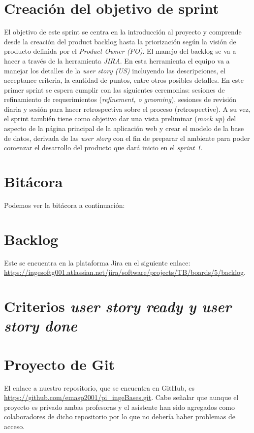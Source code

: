 \documentclass{article}
\begin{document}
\section{Creación del objetivo de sprint}
El objetivo de este sprint se centra en la introducción al proyecto y
comprende desde la creación del product backlog hasta la priorización
según la visión de producto definida por el \textit{Product Owner (PO)}.
El manejo del backlog se va a hacer a través de la herramienta \textit{JIRA}.
En esta herramienta el equipo va a manejar los detalles de la
\textit{user story (US)} incluyendo las descripciones, el acceptance
criteria, la cantidad de puntos, entre otros posibles detalles. En este
primer sprint se espera cumplir con las siguientes ceremonias: sesiones
de refinamiento de requerimientos (\textit{refinement, o grooming}),
sesiones de revisión diaria y sesión para hacer retrospectiva sobre el
proceso (retrospective). A su vez, el sprint también tiene como objetivo
dar una vista preliminar (\textit{mock up}) del aspecto de la página principal de
la aplicación web y crear el modelo de la base de datos, derivada de las
\textit{user story} con el fin de preparar el ambiente para poder comenzar
el desarrollo del producto que dará inicio en el \textit{sprint 1}. 

\section{Bitácora}
Podemos ver la bitácora a continuación:

\section{Backlog}
Este se encuentra en la plataforma Jira en el siguiente enlace:
\url{https://ingesoftg001.atlassian.net/jira/software/projects/TB/boards/5/backlog}.

\section{Criterios \textit{user story ready y user story done}}

\section{Proyecto de Git}
El enlace a nuestro repositorio, que se encuentra en GitHub, es
\url{https://github.com/emasp2001/pi_ingeBases.git}. Cabe señalar que
aunque el proyecto es privado ambas profesoras y el asistente han sido
agregados como colaboradores de dicho repositorio por lo que no debería
haber problemas de acceso.
\end{document}

